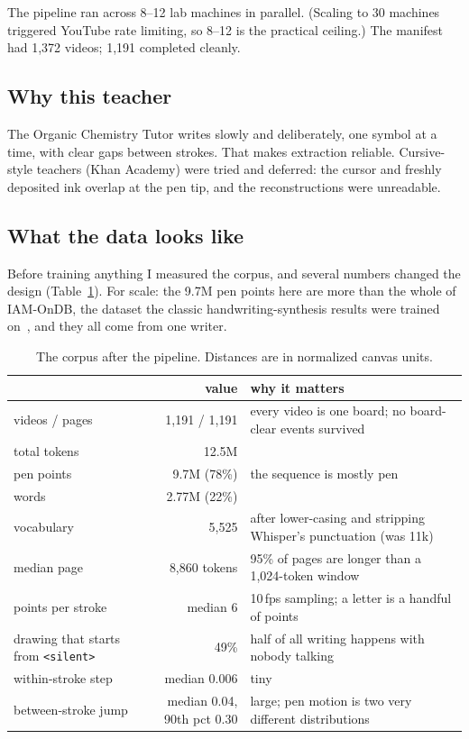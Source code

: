 \documentclass[11pt]{article}
\newcommand{\cond}[1]{\texttt{#1}}
\begin{document}
The pipeline ran across 8--12 lab machines in parallel. (Scaling to 30 machines triggered YouTube rate limiting, so 8--12 is the practical ceiling.) The manifest had 1,372 videos; 1,191 completed cleanly.

\subsection{Why this teacher}

The Organic Chemistry Tutor writes slowly and deliberately, one symbol at a time, with clear gaps between strokes. That makes extraction reliable. Cursive-style teachers (Khan Academy) were tried and deferred: the cursor and freshly deposited ink overlap at the pen tip, and the reconstructions were unreadable.

\subsection{What the data looks like}

Before training anything I measured the corpus, and several numbers changed the design (Table~\ref{tab:data}). For scale: the 9.7M pen points here are more than the whole of IAM-OnDB, the dataset the classic handwriting-synthesis results were trained on~\citep{liwicki2005iamondb,graves2013generating}, and they all come from one writer.

\begin{table}[ht!]
\centering
\small
\begin{tabular}{@{}l r l@{}}
\toprule
& value & why it matters \\
\midrule
videos / pages & 1,191 / 1,191 & every video is one board; no board-clear events survived \\
total tokens & 12.5M & \\
\quad pen points & 9.7M (78\%) & the sequence is mostly pen \\
\quad words & 2.77M (22\%) & \\
vocabulary & 5,525 & after lower-casing and stripping Whisper's punctuation (was 11k) \\
median page & 8,860 tokens & 95\% of pages are longer than a 1,024-token window \\
points per stroke & median 6 & 10\,fps sampling; a letter is a handful of points \\
drawing that starts from \cond{<silent>} & 49\% & half of all writing happens with nobody talking \\
within-stroke step & median 0.006 & tiny \\
between-stroke jump & median 0.04, 90th pct 0.30 & large; pen motion is two very different distributions \\
\bottomrule
\end{tabular}
\caption{The corpus after the pipeline. Distances are in normalized canvas units.}
\label{tab:data}
\end{table}
\end{document}
